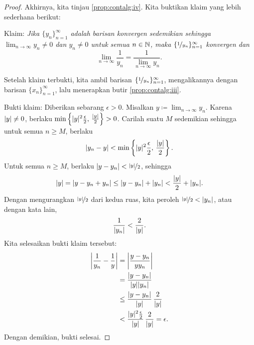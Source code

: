 \begin{proof}
Akhirnya, kita tinjau
\ref{prop:contalg:iv}.
Kita buktikan klaim yang lebih sederhana berikut:

Klaim: \emph{Jika $\{ y_n \}_{n=1}^\infty$ adalah barisan konvergen sedemikian sehingga
$\lim_{n\to\infty} y_n \neq 0$ dan $y_n \neq 0$ untuk semua $n \in {\mathbb{N}}$, maka
$\{ \nicefrac{1}{y_n} \}_{n=1}^\infty$ konvergen dan}
\begin{equation*}
\lim_{n\to\infty} \frac{1}{y_n} = \frac{1}{\lim_{n\to\infty} y_n}  .
\end{equation*}

Setelah klaim terbukti, kita ambil barisan
$\{ \nicefrac{1}{y_n} \}_{n=1}^\infty$,
mengalikannya dengan barisan $\{ x_n \}_{n=1}^\infty$, lalu menerapkan butir
\ref{prop:contalg:iii}.

Bukti klaim:  Diberikan sebarang $\epsilon > 0$.
Misalkan $y \coloneqq \lim_{n\to\infty} y_n$.
Karena $\lvert {y} \rvert \neq 0$, berlaku
$\min \left\{ \lvert {y} \rvert^2\frac{\epsilon}{2}, \, \frac{\lvert {y} \rvert}{2} \right\} > 0$.
Carilah suatu $M$ sedemikian sehingga untuk semua $n \geq M$,
berlaku
\begin{equation*}
\lvert {y_n - y} \rvert < \min \left\{ \lvert {y} \rvert^2\frac{\epsilon}{2}, \, \frac{\lvert {y} \rvert}{2}
\right\} .
\end{equation*}
Untuk semua $n \geq M$, berlaku
$\lvert {y - y_n} \rvert < \nicefrac{\lvert {y} \rvert}{2}$, sehingga
\begin{equation*}
\lvert {y} \rvert = 
\lvert {y - y_n + y_n } \rvert \leq
\lvert {y - y_n} \rvert + \lvert { y_n } \rvert < \frac{\lvert {y} \rvert}{2} + \lvert {y_n} \rvert.
\end{equation*}
Dengan mengurangkan $\nicefrac{\lvert {y} \rvert}{2}$ dari kedua ruas, kita peroleh
$\nicefrac{\lvert {y} \rvert}{2} < \lvert {y_n} \rvert$, atau dengan kata lain,
\begin{equation*}
\frac{1}{\lvert {y_n} \rvert} < \frac{2}{\lvert {y} \rvert} .
\end{equation*}
Kita selesaikan bukti klaim tersebut:
\begin{equation*}
\begin{split}
\abs{\frac{1}{y_n} - \frac{1}{y}} &=
\abs{\frac{y - y_n}{y y_n}} \\
& =
\frac{\sabs{y - y_n}}{\sabs{y} \sabs{y_n}} \\
& \leq
\frac{\sabs{y - y_n}}{\sabs{y}} \, \frac{2}{\sabs{y}} \\
& <
\frac{\sabs{y}^2 \frac{\epsilon}{2}}{\sabs{y}} \, \frac{2}{\sabs{y}}
= \epsilon .
\end{split}
\avoidbreak
\end{equation*}
Dengan demikian, bukti selesai.
\end{proof}

